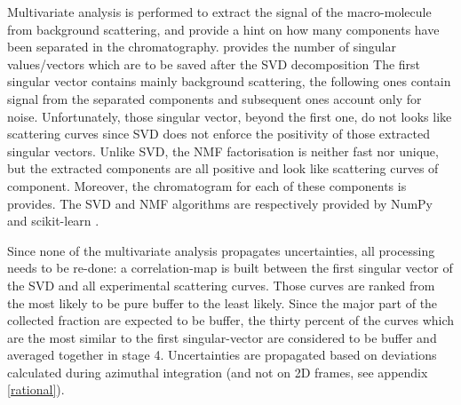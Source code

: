 \documentclass[preprint]{iucr}              %
\begin{document}
Multivariate analysis is performed to extract the signal of the macro-molecule from background scattering, and provide a hint on how many components have been separated in the chromatography.
 provides the number of singular values/vectors which are to be saved after the SVD decomposition
The first singular vector contains mainly background scattering, the following ones contain signal from the separated components and subsequent ones account only for noise.
Unfortunately, those singular vector, beyond the first one, do not looks like scattering curves since SVD does not enforce the positivity of those extracted singular vectors. 
Unlike SVD, the NMF factorisation is neither fast nor unique, but the extracted components are all positive and look like scattering curves of component. 
Moreover, the chromatogram for each of these components is provides.
The SVD and NMF algorithms are respectively provided by NumPy \cite{numpy} and scikit-learn \cite{sklearn}.


Since none of the multivariate analysis propagates uncertainties, all processing needs to be re-done:
a correlation-map is built between the first singular vector of the SVD and all experimental scattering curves. 
Those curves are ranked from the most likely to be pure buffer to the least likely. 
Since the major part of the collected fraction are expected to be buffer, the thirty percent of the curves which are the most similar to the first singular-vector are considered to be buffer and averaged together in stage 4.
Uncertainties are propagated based on deviations calculated during azimuthal integration (and not on 2D frames, see appendix \ref{rational}).
\end{document}
